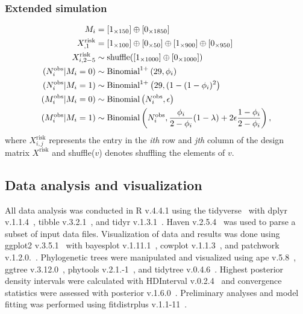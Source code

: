 \documentclass[10pt,letterpaper]{article}
\newcommand{\MI}{M^{\text{\text{obs}}}}
\begin{document}
\subsubsection{Extended simulation}
\label{sec:extended_simulation}
\begin{subequations}
\begin{align}
M_i &= [{1}_{\times 150}] \oplus [{0}_{\times 1850}]\\
X^{\text{risk}}_{,1} &= [{1}_{\times 100}] \oplus [{0}_{\times 50}] \oplus [{1}_{\times 900}] \oplus [{0}_{\times 950}]\\
X^{\text{risk}}_{i,2-5} &\sim  \text{shuffle}([{1}_{\times 1000}] \oplus [{0}_{\times 1000}]) \\
(N^{\text{obs}}_i | M_i = 0) &\sim \text{Binomial}^{1+}\left(29, \phi_i\right) \\
(N^{\text{obs}}_i | M_i = 1) &\sim \text{Binomial}^{1+}\left(29, (1-(1-\phi_i)^2\right) \\
(\MI_i | M_i = 0) &\sim \text{Binomial}\left(N^{\text{obs}}_i, \epsilon\right) \\
(\MI_i | M_i = 1) &\sim \text{Binomial}\left(N^{\text{obs}}_i, \frac{\phi_i}{2-\phi_i}(1-\lambda) + 2\epsilon\frac{1-\phi_i}{2-\phi_i}\right),
\end{align}
\end{subequations}
where $X^{\text{risk}}_{i,j}$ represents the entry in the \textit{ith} row and \textit{jth} column of the design matrix $X^{\text{risk}}$ and shuffle($v$) denotes shuffling the elements of $v$. \par

\subsection{Data analysis and visualization}
All data analysis was conducted in R v.4.4.1 \cite{R} using the tidyverse~\cite{wickham2019} with dplyr v.1.1.4~\cite{wickham2023d}, tibble v.3.2.1~\cite{muller2023}, and tidyr v.1.3.1~\cite{wickham2024}. Haven v.2.5.4~\cite{wickham2023h} was used to parse a subset of input data files. Visualization of data and results was done using ggplot2 v.3.5.1~\cite{wickham2016} with bayesplot v.1.11.1~\cite{gabry2024,gabry2019}, cowplot v.1.1.3~\cite{wilke2024}, and patchwork v.1.2.0.~\cite{pedersen2024}. Phylogenetic trees were manipulated and visualized using ape v.5.8~\cite{paradis2019}, ggtree v.3.12.0~\cite{yu2022, xu2022, yu2020, yu2018, yu2017}, phytools v.2.1.-1~\cite{revell2024}, and tidytree v.0.4.6~\cite{yu2022}. Highest posterior density intervals were calculated with HDInterval v.0.2.4~\cite{meredith2022} and convergence statistics were assessed with posterior v.1.6.0~\cite{posterior}. Preliminary analyses and model fitting was performed using fitdistrplus v.1.1-11~\cite{delignette-muller2015}. \par
\end{document}
